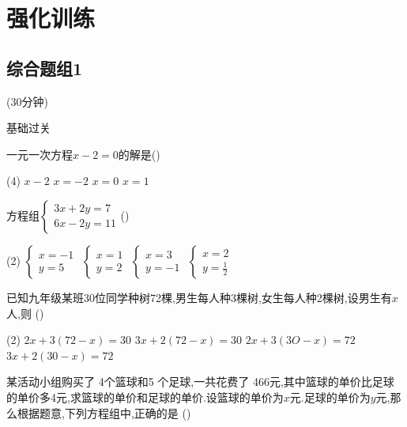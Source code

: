 \documentclass[cn,blue,12pt]{elegantbook}
\renewcommand \tkt[1]{{\CJKunderline[hidden=true, skip=true, thickness=1pt]{#1}}}
\begin{document}
\section{强化训练}%

\subsection{综合题组1}%
(30分钟)
\begin{shiti}
\item 基础过关
    \begin{shiti}[resume]
    \item 一元一次方程\(x-2=0\)的解是(\tkt{A})\\
    \begin{tasks}(4)
    \task \(x-2\)
    \task \(x=-2\)
    \task \(x=0\)
    \task \(x=1\)
    \end{tasks}
\item 方程组\(\begin{cases} 3x+2y=7\\ 6x-2y=11\end{cases}\)(\tkt{D})\\
\begin{tasks}(2)
\task \(\begin{cases} x=-1\\ y=5\end{cases}\)
\task \(\begin{cases} x=1\\ y=2\end{cases}\)
\task \(\begin{cases} x=3 \\ y=-1\end{cases}\)
\task \(\begin{cases} x=2\\ y=\frac{1}{2}\end{cases}\)
\end{tasks}
\item 已知九年级某班30位同学种树72棵,男生每人种3棵树,女生每人种2棵树,设男生有\(x\)人,则 (\tkt{D})\\
    \begin{tasks}(2)
 \task  \(2x+3(72-x) =30\)
 \task  \(3x+2(72 -x) =30\)
 \task  \(2x+3(3O-x) =72\)
 \task  \(3x +2(30-x) =72\)
 \end{tasks}
\item 某活动小组购买了 4个篮球和5 个足球,一共花费了 466元,其中篮球的单价比足球的单价多4元,求篮球的单价和足球的单价.设篮球的单价为\(x\)元.足球的单价为\(y\)元,那么根据题意,下列方程组中,正确的是 (\tkt{B})\\

\end{shiti}
\end{shiti}
\end{document}
